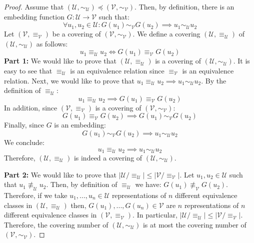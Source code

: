 \documentclass{article} %
\begin{document}
 

\begin{proof} Assume that $(\mathcal{U},\sim_\mathcal{U}) \preceq (\mathcal{V},\sim_\mathcal{V})$. Then, by definition, there is an embedding function $G:\mathcal{U} \rightarrow \mathcal{V}$ such that:
\begin{equation}
\forall u_1,u_2 \in \mathcal{U}: G(u_1) \sim_{\mathcal{V}} G(u_2) \implies u_1 \sim_{\mathcal{U}} u_2
\end{equation}
Let $(\mathcal{V},\equiv_{\mathcal{V}})$ be a covering of $(\mathcal{V},\sim_{\mathcal{V}})$. We define a covering $(\mathcal{U},\equiv_{\mathcal{U}})$ of $(\mathcal{U},\sim_{\mathcal{U}})$ as follows:
\begin{equation}
u_1 \equiv_{\mathcal{U}} u_2 \iff G(u_1) \equiv_{\mathcal{V}} G(u_2)
\end{equation}
\textbf{Part 1:} We would like to prove that $(\mathcal{U},\equiv_{\mathcal{U}})$ is a covering of $(\mathcal{U},\sim_{\mathcal{U}})$. It is easy to see that $\equiv_{\mathcal{U}}$ is an equivalence relation since $\equiv_{\mathcal{V}}$ is an equivalence relation. Next, we would like to prove that $u_1\equiv_{\mathcal{U}} u_2 \implies u_1\sim_{\mathcal{U}} u_2$. By the definition of $\equiv_{\mathcal{U}}$:
\begin{equation}
u_1 \equiv_{\mathcal{U}} u_2 \implies G(u_1) \equiv_{\mathcal{V}} G(u_2) 
\end{equation}
In addition, since $(\mathcal{V},\equiv_{\mathcal{V}})$ is a covering of $(\mathcal{V},\sim_{\mathcal{V}})$:
\begin{equation}
G(u_1) \equiv_{\mathcal{V}} G(u_2) \implies G(u_1) \sim_{\mathcal{V}} G(u_2)
\end{equation}
Finally, since $G$ is an embedding:
\begin{equation}
G(u_1) \sim_{\mathcal{V}} G(u_2) \implies u_1 \sim_{\mathcal{U}} u_2
\end{equation}
We conclude:
\begin{equation}
u_1 \equiv_{\mathcal{U}} u_2 \implies  u_1 \sim_{\mathcal{U}} u_2
\end{equation}
Therefore, $(\mathcal{U},\equiv_{\mathcal{U}})$ is indeed a covering of $(\mathcal{U},\sim_{\mathcal{U}})$.
 
\textbf{Part 2:} We would like to prove that $|\mathcal{U}/\equiv_{\mathcal{U}}| \leq |\mathcal{V}/\equiv_{\mathcal{V}}|$.  Let $u_1, u_2 \in \mathcal{U}$ such that $u_1 \not\equiv_{\mathcal{U}} u_2$. Then, by definition of $\equiv_{\mathcal{U}}$ we have: $G(u_1) \not\equiv_{\mathcal{V}} G(u_2)$. Therefore, if we take $u_1,...,u_n \in \mathcal{U}$ representations of $n$ different equivalence classes in $(\mathcal{U},\equiv_{\mathcal{U}})$ then, $G(u_1),...,G(u_n) \in \mathcal{V}$ are $n$ representations of $n$ different equivalence classes in $(\mathcal{V},\equiv_{\mathcal{V}})$. In particular, $|\mathcal{U}/\equiv_{\mathcal{U}}| \leq |\mathcal{V}/\equiv_{\mathcal{V}}|$. Therefore, the covering number of $(\mathcal{U},\sim_{\mathcal{U}})$ is at most the covering number of $(\mathcal{V},\sim_{\mathcal{V}})$.  
\end{proof}
\end{document}

